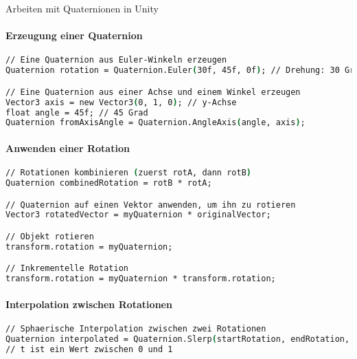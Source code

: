 \begin{KR}{Arbeiten mit Quaternionen in Unity}\\
    \paragraph{Erzeugung einer Quaternion}
    \begin{lstlisting}[language=csh, style=basesmol]
// Eine Quaternion aus Euler-Winkeln erzeugen
Quaternion rotation = Quaternion.Euler(30f, 45f, 0f); // Drehung: 30 Grad um x, 45 Grad um y

// Eine Quaternion aus einer Achse und einem Winkel erzeugen
Vector3 axis = new Vector3(0, 1, 0); // y-Achse
float angle = 45f; // 45 Grad
Quaternion fromAxisAngle = Quaternion.AngleAxis(angle, axis);
    \end{lstlisting}
    
    \paragraph{Anwenden einer Rotation}
    \begin{lstlisting}[language=csh, style=basesmol]
// Rotationen kombinieren (zuerst rotA, dann rotB)
Quaternion combinedRotation = rotB * rotA;

// Quaternion auf einen Vektor anwenden, um ihn zu rotieren
Vector3 rotatedVector = myQuaternion * originalVector;

// Objekt rotieren
transform.rotation = myQuaternion;

// Inkrementelle Rotation
transform.rotation = myQuaternion * transform.rotation;
    \end{lstlisting}
    
    \paragraph{Interpolation zwischen Rotationen}
    \begin{lstlisting}[language=csh, style=basesmol]
// Sphaerische Interpolation zwischen zwei Rotationen
Quaternion interpolated = Quaternion.Slerp(startRotation, endRotation, t);
// t ist ein Wert zwischen 0 und 1
    \end{lstlisting}
\end{KR}

